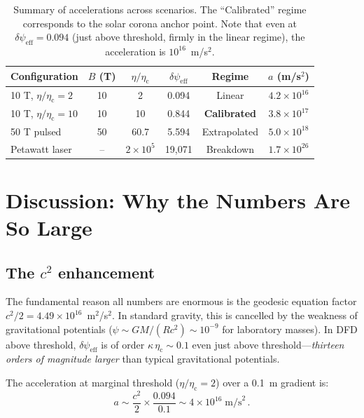 \documentclass[12pt,a4paper]{article}
\newcommand{\psieff}{\psi_{\mathrm{eff}}}
\newcommand{\etac}{\eta_{\mathrm{c}}}
\begin{document}
\begin{table}[H]
\centering
\begin{tabular}{lccccc}
\toprule
\textbf{Configuration} & $B$ (T) & $\eta/\etac$ & $\delta\psieff$ & Regime & $a$ (m/s$^2$) \\
\midrule
10 T, $\eta/\etac = 2$   & 10 & 2    & 0.094 & Linear        & $4.2 \times 10^{16}$ \\
10 T, $\eta/\etac = 10$  & 10 & 10   & 0.844 & \textbf{Calibrated} & $3.8 \times 10^{17}$ \\
50 T pulsed               & 50 & 60.7 & 5.594 & Extrapolated  & $5.0 \times 10^{18}$ \\
Petawatt laser            & -- & $2 \times 10^5$ & 19{,}071 & Breakdown & $1.7 \times 10^{26}$ \\
\bottomrule
\end{tabular}
\caption{Summary of accelerations across scenarios. The ``Calibrated'' regime corresponds to the
solar corona anchor point. Note that even at $\delta\psieff = 0.094$ (just above threshold, firmly
in the linear regime), the acceleration is $10^{16}$~m/s$^2$.}
\label{tab:summary}
\end{table}

\section{Discussion: Why the Numbers Are So Large}
\label{sec:discussion}

\subsection{The $c^2$ enhancement}

The fundamental reason all numbers are enormous is the geodesic equation factor $c^2/2 = 4.49 \times 10^{16}$~m$^2$/s$^2$.
In standard gravity, this is cancelled by the weakness of gravitational potentials ($\psi \sim GM/(Rc^2) \sim 10^{-9}$
for laboratory masses). In DFD above threshold, $\delta\psieff$ is of order $\kappa\,\etac \sim 0.1$ even just above
threshold---\emph{thirteen orders of magnitude larger} than typical gravitational potentials.

The acceleration at marginal threshold ($\eta/\etac = 2$) over a 0.1~m gradient is:
\begin{equation}
a \sim \frac{c^2}{2} \times \frac{0.094}{0.1} \sim 4 \times 10^{16} \;\text{m/s}^2\,.
\end{equation}
\end{document}
